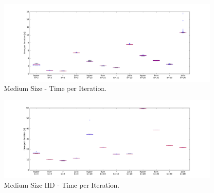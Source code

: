 \begin{figure}[htsb]
  \centerline{
    \includegraphics[scale=0.4, trim="0cm 1cm 0cm 0cm"]{figures/charts/15M_all}
  }
  \caption[Medium Size - Time per Iteration (Competitors)]{Medium Size - Time per Iteration.}
  \label{fig:15M_all}
\end{figure}


\begin{figure}[htsb]
  \centerline{
    \includegraphics[scale=0.4, trim="0cm 1cm 0cm 0cm"]{figures/charts/15Mxhd_all}
  }
  \caption[Medium Size HD - Time per Iteration (Competitors)]{Medium Size HD - Time per Iteration.}
  \label{fig:15Mxhd_all}
\end{figure}



